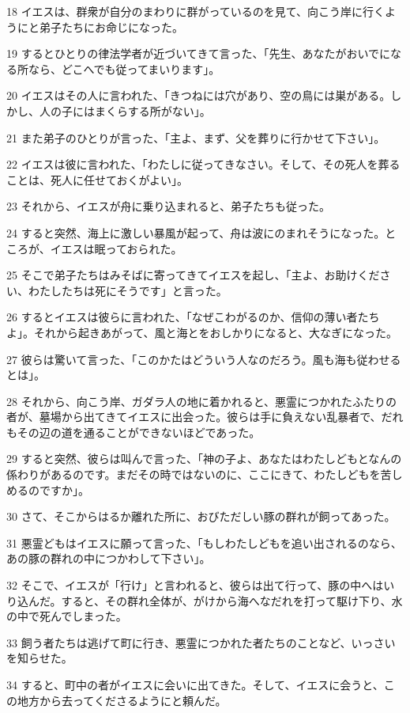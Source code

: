 \par 18 イエスは、群衆が自分のまわりに群がっているのを見て、向こう岸に行くようにと弟子たちにお命じになった。
\par 19 するとひとりの律法学者が近づいてきて言った、「先生、あなたがおいでになる所なら、どこへでも従ってまいります」。
\par 20 イエスはその人に言われた、「きつねには穴があり、空の鳥には巣がある。しかし、人の子にはまくらする所がない」。
\par 21 また弟子のひとりが言った、「主よ、まず、父を葬りに行かせて下さい」。
\par 22 イエスは彼に言われた、「わたしに従ってきなさい。そして、その死人を葬ることは、死人に任せておくがよい」。
\par 23 それから、イエスが舟に乗り込まれると、弟子たちも従った。
\par 24 すると突然、海上に激しい暴風が起って、舟は波にのまれそうになった。ところが、イエスは眠っておられた。
\par 25 そこで弟子たちはみそばに寄ってきてイエスを起し、「主よ、お助けください、わたしたちは死にそうです」と言った。
\par 26 するとイエスは彼らに言われた、「なぜこわがるのか、信仰の薄い者たちよ」。それから起きあがって、風と海とをおしかりになると、大なぎになった。
\par 27 彼らは驚いて言った、「このかたはどういう人なのだろう。風も海も従わせるとは」。
\par 28 それから、向こう岸、ガダラ人の地に着かれると、悪霊につかれたふたりの者が、墓場から出てきてイエスに出会った。彼らは手に負えない乱暴者で、だれもその辺の道を通ることができないほどであった。
\par 29 すると突然、彼らは叫んで言った、「神の子よ、あなたはわたしどもとなんの係わりがあるのです。まだその時ではないのに、ここにきて、わたしどもを苦しめるのですか」。
\par 30 さて、そこからはるか離れた所に、おびただしい豚の群れが飼ってあった。
\par 31 悪霊どもはイエスに願って言った、「もしわたしどもを追い出されるのなら、あの豚の群れの中につかわして下さい」。
\par 32 そこで、イエスが「行け」と言われると、彼らは出て行って、豚の中へはいり込んだ。すると、その群れ全体が、がけから海へなだれを打って駆け下り、水の中で死んでしまった。
\par 33 飼う者たちは逃げて町に行き、悪霊につかれた者たちのことなど、いっさいを知らせた。
\par 34 すると、町中の者がイエスに会いに出てきた。そして、イエスに会うと、この地方から去ってくださるようにと頼んだ。

